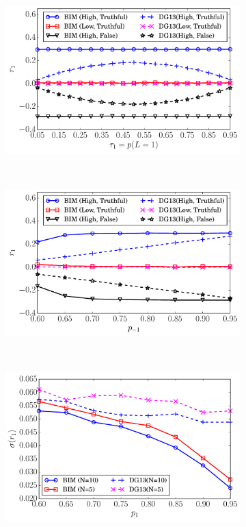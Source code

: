 \begin{figure}[!t]
    \centering
    \begin{subfigure}[t]{0.24\textwidth}
        \centering
        \includegraphics[width=\textwidth]{image/BPP1}
        \caption{\label{BIM2}}
    \end{subfigure}%
    ~
    \begin{subfigure}[t]{0.24\textwidth}
        \centering
        \includegraphics[width=\textwidth]{image/BPP2}
        \caption{\label{BIM3}}
    \end{subfigure}
        ~
    \begin{subfigure}[t]{0.24\textwidth}
        \centering
        \includegraphics[width=\textwidth]{image/BPP3}

\end{subfigure}
\end{figure}
